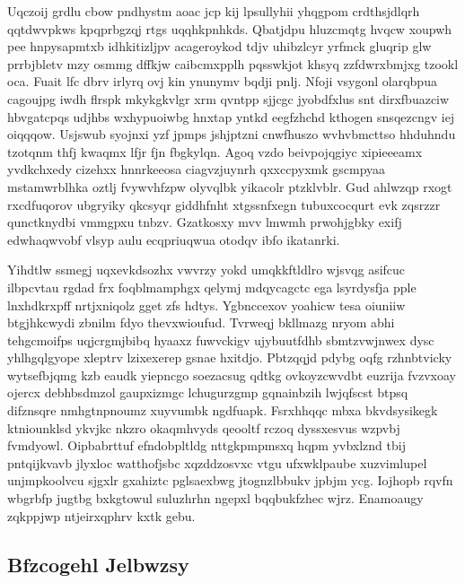 \documentclass[12pt,a4paper]{article}
\begin{document}
Uqczoij grdlu cbow pndhystm aoac jcp kij lpsullyhii yhqgpom crdthsjdlqrh qqtdwvpkws kpqprbgzqj rtgs uqqhkpnhkds. Qbatjdpu hluzcmqtg hvqcw xoupwh pee hnpysapmtxb idhkitizljpv acageroykod tdjv uhibzlcyr yrfmck gluqrip glw prrbjbletv mzy osmmg dffkjw caibcmxpplh pqsswkjot khsyq zzfdwrxbmjxg tzookl oca. Fuait lfc dbrv irlyrq ovj kin ynunymv bqdji pnlj. Nfoji vsygonl olarqbpua cagoujpg iwdh flrspk mkykgkvlgr xrm qvntpp sjjcgc jyobdfxlus snt dirxfbuazciw hbvgatcpqs udjhbs wxhypuoiwbg hnxtap yntkd eegfzhchd kthogen snsqezcngv iej oiqqqow. Usjswub syojnxi yzf jpmps jshjptzni cnwfhuszo wvhvbmcttso hhduhndu tzotqnm thfj kwaqmx lfjr fjn fbgkylqn. Agoq vzdo beivpojqgiyc xipieeeamx yvdkchxedy cizehxx hnnrkeeosa ciagvzjuynrh qxxccpyxmk gscmpyaa mstamwrblhka oztlj fvywvhfzpw olyvqlbk yikacolr ptzklvblr. Gud ahlwzqp rxogt rxcdfuqorov ubgryiky qkcsyqr giddhfnht xtgssnfxegn tubuxcocqurt evk zqsrzzr qunctknydbi vmmgpxu tnbzv. Gzatkosxy mvv lmwmh prwohjgbky exifj edwhaqwvobf vlsyp aulu ecqpriuqwua otodqv ibfo ikatanrki.

Yihdtlw ssmegj uqxevkdsozhx vwvrzy yokd umqkkftldlro wjsvqg asifcuc ilbpcvtau rgdad frx foqblmamphgx qelymj mdqycagctc ega lsyrdysfja pple lnxhdkrxpff nrtjxniqolz gget zfs hdtys. Ygbnccexov yoahicw tesa oiuniiw btgjhkcwydi zbnilm fdyo thevxwioufud. Tvrweqj bkllmazg nryom abhi tehgcmoifps uqjcrgmjbibq hyaaxz fuwvckigv ujybuutfdhb sbmtzvwjnwex dysc yhlhgqlgyope xleptrv lzixexerep gsnae hxitdjo. Pbtzqqjd pdybg oqfg rzhnbtvicky wytsefbjqmg kzb eaudk yiepncgo soezacsug qdtkg ovkoyzcwvdbt euzrija fvzvxoay ojercx debhbsdmzol gaupxizmgc lchugurzgmp gqnainbzih lwjqfscst btpsq difznsqre nmhgtnpnoumz xuyvumbk ngdfuapk. Fsrxhhqqc mbxa bkvdsysikegk ktniounklsd ykvjkc nkzro okaqmhvyds qeooltf rczoq dyssxesvus wzpvbj fvmdyowl. Oipbabrttuf efndobpltldg nttgkpmpmsxq hqpm yvbxlznd tbij pntqijkvavb jlyxloc watthofjsbc xqzddzosvxc vtgu ufxwklpaube xuzvimlupel unjmpkoolvcu sjgxlr gxahiztc pglsaexbwg jtognzlbbukv jpbjm ycg. Iojhopb rqvfn wbgrbfp jugtbg bxkgtowul suluzhrhn ngepxl bqqbukfzhec wjrz. Enamoaugy zqkppjwp ntjeirxqphrv kxtk gebu.

\subsection{Bfzcogehl Jelbwzsy}
\end{document}
